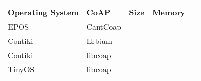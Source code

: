 \begin{table}[h]
\begin{tabular}{@{}lllll@{}}
\toprule
Operating System & CoAP & Size &  Memory &  &  \\ \midrule
EPOS &  CantCoap &  &  &  \\
Contiki &  Erbium &  &  &  \\
Contiki &  libcoap &  &  &  \\
TinyOS &  libcoap &  &  &  \\ \bottomrule
\end{tabular}
\end{table}

%
%
%
% 
% 
% 
% 
